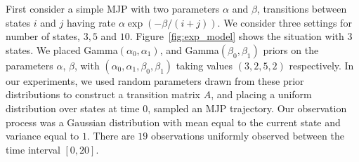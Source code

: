 \noindent First consider a simple MJP with two parameters $\alpha$ and $\beta$, transitions between states $i$ and $j$ having rate $\alpha \exp(-\beta/(i+j))$.
We consider three settings for number of states, $3, 5$ and $10$.
Figure~\ref{fig:exp_model} shows the situation with $3$ states.  
We placed Gamma$(\alpha_0,\alpha_1)$, and Gamma$(\beta_0, \beta_1)$ priors on the parameters $\alpha$, $\beta$, with $(\alpha_0,\alpha_1,\beta_0,\beta_1)$ taking
values $(3,2,5,2)$ respectively. In our experiments, we used random parameters drawn from these prior distributions to construct a transition matrix $A$,
and placing a uniform distribution over states at time $0$, sampled an MJP trajectory.
Our observation process was a Gaussian distribution with mean equal to the current state and variance equal to $1$. There are $19$ observations uniformly observed between the time interval $[0, 20]$.

